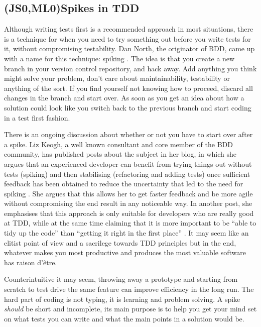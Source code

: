 \documentclass[11pt]{article}
\begin{document}
\subsection{(JS0,ML0)Spikes in TDD}

Although writing tests first is a recommended approach in most situations, there is a technique for when you need to try something out before you write tests for it, without compromising testability. Dan North, the originator of BDD, came up with a name for this technique: spiking \cite{TwitterDanNorth}. The idea is that you create a new branch in your version control repository, and hack away. Add anything you think might solve your problem, don't care about maintainability, testability or anything of the sort. If you find yourself not knowing how to proceed, discard all changes in the branch and start over. As soon as you get an idea about how a solution could look like you switch back to the previous branch and start coding in a test first fashion. \cite[question~59]{Edelstam}

There is an ongoing discussion about whether or not you have to start over after a spike. Liz Keogh, a well known consultant and core member of the BDD community, has published posts about the subject in her blog, in which she argues that an experienced developer can benefit from trying things out without tests (spiking) and then stabilising (refactoring and adding tests) once sufficient feedback has been obtained to reduce the uncertainty that led to the need for spiking \cite{Liz1}. She argues that this allows her to get faster feedback and be more agile without compromising the end result in any noticeable way. In another post, she emphasises that this approach is only suitable for developers who are really good at TDD, while at the same time claiming that it is more important to be ``able to tidy up the code'' than ``getting it right in the first place'' \cite{Liz2}. It may seem like an elitist point of view and a sacrilege towards TDD principles but in the end, whatever makes you most productive and produces the most valuable software has raison d'être.

Counterintuitive it may seem, throwing away a prototype and starting from scratch to test drive the same feature can improve efficiency in the long run. The hard part of coding is not typing, it is learning and problem solving. A spike \emph{should} be short and incomplete, its main purpose is to help you get your mind set on what tests you can write and what the main points in a solution would be. \cite[question~60]{Edelstam}
\end{document}

